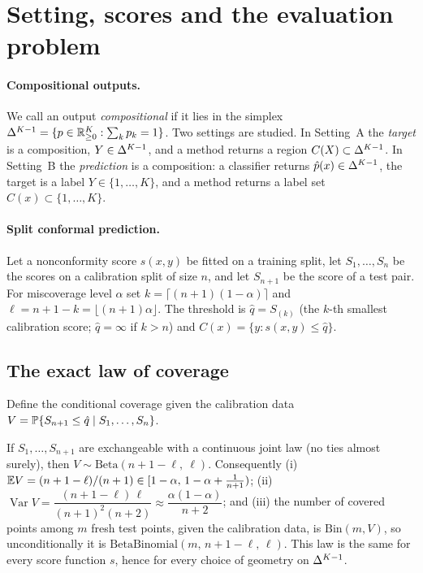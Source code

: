 \section{Setting, scores and the evaluation problem}
\label{sec:method}

\paragraph{Compositional outputs.}
We call an output \emph{compositional} if it lies in the simplex $\Delta^{K-1}=\{p\in\mathbb{R}^K_{\ge0}:\sum_k p_k=1\}$.
Two settings are studied.
In Setting~A the \emph{target} is a composition, $Y\in\Delta^{K-1}$, and a method returns a region $C(X)\subset\Delta^{K-1}$.
In Setting~B the \emph{prediction} is a composition: a classifier returns $\hat p(x)\in\Delta^{K-1}$, the target is a label $Y\in\{1,\dots,K\}$, and a method returns a label set $C(x)\subset\{1,\dots,K\}$.

\paragraph{Split conformal prediction.}
Let a nonconformity score $s(x,y)$ be fitted on a training split, let $S_1,\dots,S_n$ be the scores on a calibration split of size $n$, and let $S_{n+1}$ be the score of a test pair.
For miscoverage level $\alpha$ set $k=\lceil (n+1)(1-\alpha)\rceil$ and $\ell=n+1-k=\lfloor (n+1)\alpha\rfloor$.
The threshold is $\hat q=S_{(k)}$ (the $k$-th smallest calibration score; $\hat q=\infty$ if $k>n$) and $C(x)=\{y:s(x,y)\le \hat q\}$.

\subsection{The exact law of coverage}
\label{sec:theory}
Define the conditional coverage given the calibration data $V=\mathbb{P}\{S_{n+1}\le\hat q\mid S_1,\dots,S_n\}$.

\begin{proposition}\label{prop:beta}
If $S_1,\dots,S_{n+1}$ are exchangeable with a continuous joint law (no ties almost surely), then $V\sim\mathrm{Beta}(n+1-\ell,\ \ell)$.
Consequently (i) $\mathbb{E} V=(n+1-\ell)/(n+1)\in[1-\alpha,\,1-\alpha+\tfrac1{n+1})$; (ii) $\operatorname{Var}V=\dfrac{(n+1-\ell)\,\ell}{(n+1)^2(n+2)}\approx\dfrac{\alpha(1-\alpha)}{n+2}$; and (iii) the number of covered points among $m$ fresh test points, given the calibration data, is $\mathrm{Bin}(m,V)$, so unconditionally it is $\mathrm{BetaBinomial}(m,\,n+1-\ell,\,\ell)$.
This law is the same for every score function $s$, hence for every choice of geometry on $\Delta^{K-1}$.
\end{proposition}

